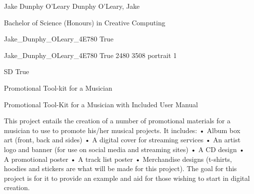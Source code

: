
\begingroup{}\relax



\def\Key{Jake_Dunphy_OLeary_4E780}

{Jake Dunphy O'Leary}
{Dunphy O'Leary, Jake}

{Bachelor of Science (Honours) in Creative Computing}

{Jake_Dunphy_OLeary_4E780}
{True}

{Jake_Dunphy_OLeary_4E780}
{True}
{2480}
{3508}
{portrait}
{1}

{SD}
{True}

{Promotional Tool-kit for a Musician}

{Promotional Tool-Kit for a Musician with Included User Manual}

{This project entails the creation of a number of promotional materials for a musician to use to promote his/her musical projects. It includes:
•	Album box art (front, back and sides)
•	A digital cover for streaming services
•	An artist logo and banner (for use on social media and streaming sites)
•	A CD design
•	A promotional poster
•	A track list poster
•	Merchandise designs (t-shirts, hoodies and stickers are what will be made for this project).
The goal for this project is for it to provide an example and aid for those wishing to start in digital creation.}

